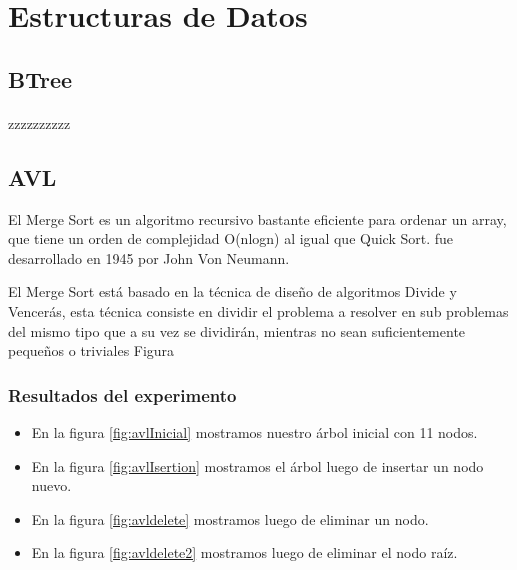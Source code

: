 \documentclass{article}
\begin{document}
	\section{Estructuras de Datos}
        \subsection{BTree}
            \paragraph{}
   zzzzzzzzzz


        \subsection{AVL}

         El Merge Sort es un algoritmo recursivo bastante eficiente para ordenar un array, que tiene un orden de complejidad O(nlogn) al igual que Quick Sort. fue desarrollado en 1945 por John Von Neumann.

         El Merge Sort está basado en la técnica de diseño de algoritmos Divide y Vencerás, esta técnica consiste en dividir el problema a resolver en sub problemas del mismo tipo que a su vez se dividirán, mientras no sean suficientemente  pequeños o triviales Figura
         
         \subsubsection{Resultados del experimento}
         \begin{itemize}
           \item En la figura \ref{fig:avlInicial} mostramos nuestro árbol inicial con 11 nodos.
           \item En la figura \ref{fig:avlIsertion} mostramos el árbol luego de insertar un nodo nuevo.
           \item En la figura \ref{fig:avldelete} mostramos luego de eliminar un nodo.
           \item En la figura \ref{fig:avldelete2} mostramos luego de eliminar el nodo raíz.
         \end{itemize}
 
\end{document}
